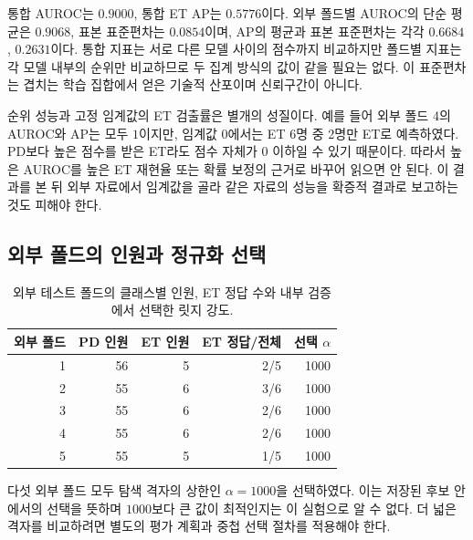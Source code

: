 통합 AUROC는 \(0.9000\), 통합 ET AP는 \(0.5776\)이다.
외부 폴드별 AUROC의 단순 평균은 \(0.9068\), 표본 표준편차는
\(0.0854\)이며, AP의 평균과 표본 표준편차는 각각
\(0.6684\), \(0.2631\)이다.
통합 지표는 서로 다른 모델 사이의 점수까지 비교하지만 폴드별 지표는
각 모델 내부의 순위만 비교하므로 두 집계 방식의 값이 같을 필요는 없다.
이 표준편차는 겹치는 학습 집합에서 얻은 기술적 산포이며 신뢰구간이 아니다.

순위 성능과 고정 임계값의 ET 검출률은 별개의 성질이다.
예를 들어 외부 폴드 4의 AUROC와 AP는 모두 \(1\)이지만,
임계값 \(0\)에서는 ET 6명 중 2명만 ET로 예측하였다.
PD보다 높은 점수를 받은 ET라도 점수 자체가 \(0\) 이하일 수 있기 때문이다.
따라서 높은 AUROC를 높은 ET 재현율 또는 확률 보정의 근거로 바꾸어 읽으면
안 된다. 이 결과를 본 뒤 외부 자료에서 임계값을 골라 같은 자료의 성능을
확증적 결과로 보고하는 것도 피해야 한다.

\clearpage
\subsection{외부 폴드의 인원과 정규화 선택}
\begin{table}[H]
\centering\small
\caption{외부 테스트 폴드의 클래스별 인원, ET 정답 수와
내부 검증에서 선택한 릿지 강도.}
\label{tab:observed-folds}
\begin{tabular}{@{}rrrrr@{}}
\toprule 외부 폴드 & PD 인원 & ET 인원 & ET 정답/전체 & 선택 \(\alpha\)\\ \midrule
1 & 56 & 5 & 2/5 & 1000\\
2 & 55 & 6 & 3/6 & 1000\\
3 & 55 & 6 & 2/6 & 1000\\
4 & 55 & 6 & 2/6 & 1000\\
5 & 55 & 5 & 1/5 & 1000\\

\bottomrule
\end{tabular}
\end{table}
다섯 외부 폴드 모두 탐색 격자의 상한인 \(\alpha=1000\)을 선택하였다.
이는 저장된 후보 안에서의 선택을 뜻하며 \(1000\)보다 큰 값이 최적인지는
이 실험으로 알 수 없다. 더 넓은 격자를 비교하려면 별도의 평가 계획과
중첩 선택 절차를 적용해야 한다.

